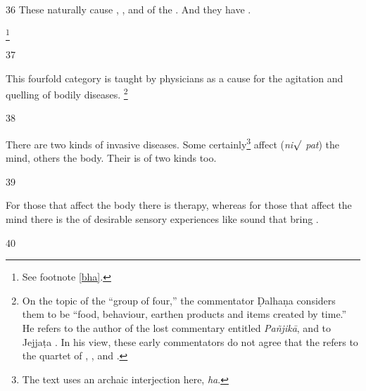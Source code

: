 \begin{translation}
    
    \item[36]  These naturally cause 
    , 
    , 
    and 
     of the . And they have
    .
    
    \footnote{See footnote \ref{bha}.}
    
    \item[37] 
    \begin{sloka}
        This fourfold category is taught by physicians as a cause for the agitation and 
        quelling of bodily diseases.%
        \footnote{On the topic of the “group of four,” the commentator Ḍalhaṇa
        considers them to be “food, behaviour, earthen products and items created by
        time.”  He refers to the author of the lost commentary entitled \emph{Pañjikā},
        and to Jejjaṭa \citep[IA, 372--3, 192]{meul-hist}.  In his view, these early
        commentators  do not agree that the  refers
        to the quartet of , ,
         and  \citep[9a]{vulgate}.}
    \end{sloka}
    
    \item[38] \begin{sloka}
        There are two kinds of invasive diseases. Some certainly\footnote{The
        text uses an archaic interjection here, \emph{ha}.} 
        affect (\emph{ni$\surd$ pat}) 
        the
        mind, others the body. Their  is of two kinds too.
    \end{sloka}
    
    \item[39]\begin{sloka}
        For those that affect the body there is  
        therapy, whereas for those that affect the mind there is the 
         of desirable sensory experiences like sound that 
        bring .
        
    \end{sloka}
    
    \item [40] 
    

\end{translation}
